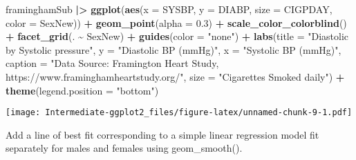 \documentclass[
]{article}
\newenvironment{Shaded}{\begin{snugshade}}{\end{snugshade}}
\newcommand{\AttributeTok}[1]{\textcolor[rgb]{0.13,0.29,0.53}{#1}}
\newcommand{\FloatTok}[1]{\textcolor[rgb]{0.00,0.00,0.81}{#1}}
\newcommand{\FunctionTok}[1]{\textcolor[rgb]{0.13,0.29,0.53}{\textbf{#1}}}
\newcommand{\NormalTok}[1]{#1}
\newcommand{\SpecialCharTok}[1]{\textcolor[rgb]{0.81,0.36,0.00}{\textbf{#1}}}
\newcommand{\StringTok}[1]{\textcolor[rgb]{0.31,0.60,0.02}{#1}}
\begin{document}
\begin{Shaded}
\begin{Highlighting}[]
\NormalTok{framinghamSub }\SpecialCharTok{|\textgreater{}}
  \FunctionTok{ggplot}\NormalTok{(}\FunctionTok{aes}\NormalTok{(}\AttributeTok{x =}\NormalTok{ SYSBP, }\AttributeTok{y =}\NormalTok{ DIABP,}
             \AttributeTok{size =}\NormalTok{ CIGPDAY,}
             \AttributeTok{color =}\NormalTok{ SexNew)) }\SpecialCharTok{+}
  \FunctionTok{geom\_point}\NormalTok{(}\AttributeTok{alpha =} \FloatTok{0.3}\NormalTok{) }\SpecialCharTok{+}
  \FunctionTok{scale\_color\_colorblind}\NormalTok{() }\SpecialCharTok{+}
  \FunctionTok{facet\_grid}\NormalTok{(. }\SpecialCharTok{\textasciitilde{}}\NormalTok{ SexNew) }\SpecialCharTok{+}
  \FunctionTok{guides}\NormalTok{(}\AttributeTok{color =} \StringTok{"none"}\NormalTok{) }\SpecialCharTok{+}
  \FunctionTok{labs}\NormalTok{(}\AttributeTok{title =} \StringTok{"Diastolic by Systolic pressure"}\NormalTok{,}
       \AttributeTok{y =} \StringTok{"Diastolic BP (mmHg)"}\NormalTok{,}
       \AttributeTok{x =} \StringTok{"Systolic BP (mmHg)"}\NormalTok{,}
       \AttributeTok{caption =} \StringTok{"Data Source: Framington Heart Study, https://www.framinghamheartstudy.org/"}\NormalTok{,}
       \AttributeTok{size =} \StringTok{"Cigarettes Smoked daily"}\NormalTok{) }\SpecialCharTok{+}
  \FunctionTok{theme}\NormalTok{(}\AttributeTok{legend.position =} \StringTok{"bottom"}\NormalTok{)}
\end{Highlighting}
\end{Shaded}

\texttt{[image: Intermediate-ggplot2\_files/figure-latex/unnamed-chunk-9-1.pdf]}

Add a line of best fit corresponding to a simple linear regression model
fit separately for males and females using geom\_smooth().
\end{document}
